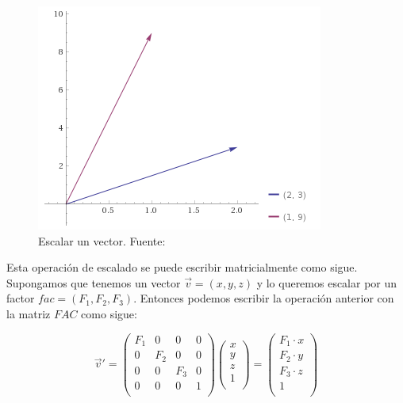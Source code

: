 \begin{figure}[h]
	\centering
	\includegraphics{figures/scaling.png}
	\caption[Escalar un vector.]{Escalar un vector. Fuente:~\cite{wolfram}}
	\label{fig:scaling}
\end{figure}

Esta operación de escalado se puede escribir matricialmente como sigue.
Supongamos que tenemos un vector $\overrightarrow{v}=(x,y,z)$ y lo queremos
escalar por un factor $fac=(F_1,F_2,F_3)$. Entonces podemos escribir la
operación anterior con la matriz $FAC$ como sigue:

\begin{equation}
	\label{eq:matrixscaling}
	\overrightarrow{v}' = 
	\left( \begin{array}{cccc}
			F_1 & 0   & 0   & 0	\\
			0   & F_2 & 0   & 0	\\
			0   & 0   & F_3 & 0	\\
			0   & 0   & 0   & 1	\\
	\end{array} \right)
	\left( \begin{array}{c}
			x \\
			y \\
			z \\
			1 \\
	\end{array} \right) =
	\left( \begin{array}{c}
			F_1\cdot x \\
			F_2\cdot y \\
			F_3\cdot z \\
			1 \\
	\end{array} \right)
\end{equation}\\


